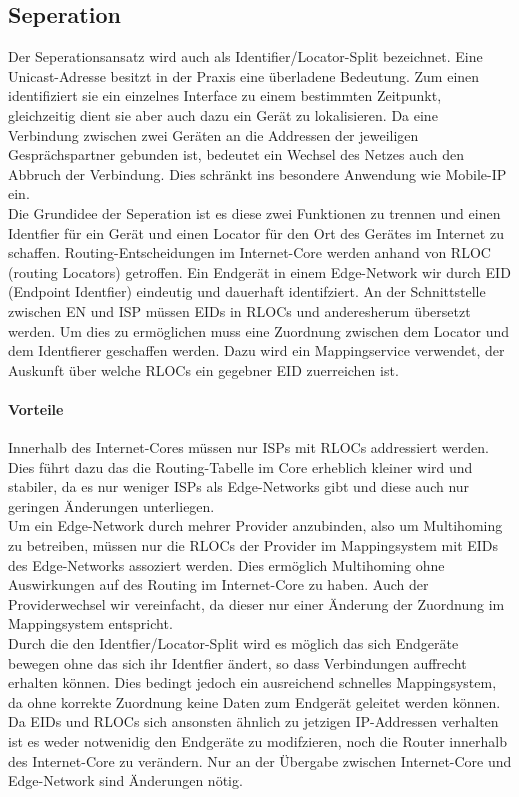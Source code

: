 \subsection{Seperation}
Der Seperationsansatz wird auch als Identifier/Locator-Split bezeichnet. Eine Unicast-Adresse besitzt in der Praxis eine überladene Bedeutung. Zum einen identifiziert sie ein einzelnes Interface zu einem bestimmten Zeitpunkt, gleichzeitig dient sie aber auch dazu ein Gerät zu lokalisieren. Da eine Verbindung zwischen zwei Geräten an die Addressen der jeweiligen Gesprächspartner gebunden ist, bedeutet ein Wechsel des Netzes auch den Abbruch der Verbindung. Dies schränkt ins besondere Anwendung wie Mobile-IP ein. \\

Die Grundidee der Seperation ist es diese zwei Funktionen zu trennen und einen Identfier für ein Gerät und einen Locator für den Ort des Gerätes im Internet zu schaffen. Routing-Entscheidungen im Internet-Core werden anhand von RLOC (routing Locators) getroffen. Ein Endgerät in einem Edge-Network wir durch EID (Endpoint Identfier) eindeutig und dauerhaft identifziert. An der Schnittstelle zwischen EN und ISP müssen EIDs in RLOCs und anderesherum übersetzt werden. Um dies zu ermöglichen muss eine Zuordnung zwischen dem Locator und dem Identfierer geschaffen werden. Dazu wird ein Mappingservice verwendet, der Auskunft über welche RLOCs ein gegebner EID zuerreichen ist. 

\paragraph{Vorteile}
Innerhalb des Internet-Cores müssen nur ISPs mit RLOCs addressiert werden. Dies führt dazu das die Routing-Tabelle im Core erheblich kleiner wird und stabiler, da es nur weniger ISPs als Edge-Networks gibt und diese auch nur geringen Änderungen unterliegen. \\
Um ein Edge-Network durch mehrer Provider anzubinden, also um Multihoming zu betreiben, müssen nur die RLOCs der Provider im Mappingsystem mit EIDs des Edge-Networks assoziert werden. Dies ermöglich Multihoming ohne Auswirkungen auf des Routing im Internet-Core zu haben. Auch der Providerwechsel wir vereinfacht, da dieser nur einer Änderung der Zuordnung im Mappingsystem entspricht. \\
Durch die den Identfier/Locator-Split wird es möglich das sich Endgeräte bewegen ohne das sich ihr Identfier ändert, so dass Verbindungen auffrecht erhalten können. Dies bedingt jedoch ein ausreichend schnelles Mappingsystem, da ohne korrekte Zuordnung keine Daten zum Endgerät geleitet werden können. \\
Da EIDs und RLOCs sich ansonsten ähnlich zu jetzigen IP-Addressen verhalten ist es weder notwenidig den Endgeräte zu modifzieren, noch die Router innerhalb des Internet-Core zu verändern. Nur an der Übergabe zwischen Internet-Core und Edge-Network sind Änderungen nötig. 

